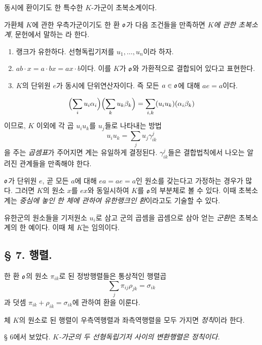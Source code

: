 동시에 환이기도 한 특수한 \(K\)-가군이 \glqq{}초복소계\grqq{}이다.

가환체 \(K\)에 관한 우측가군이기도 한 환 \(\mathfrak o\)가 다음 조건들을 만족하면 \emph{\(K\)에 관한 초복소계}, 문헌에서 말하는 라 한다.
\begin{enumerate}
\item 랭크가 유한하다. 선형독립기저를 \(u_1,\ldots,u_n\)이라 하자.
\item \(ab\cdot x=a\cdot bx=ax\cdot b\)이다. 이를 \(K\)가 \(\mathfrak o\)와 가환적으로 결합되어 있다고 표현한다.
\item \(K\)의 단위원 \(e\)가 동시에 단위연산자이다. 즉 모든 \(a\in\mathfrak o\)에 대해 \(ae=a\)이다.\footnotemark
\end{enumerate}

\[
        \Bigl(\sum_i u_i\alpha_i\Bigr)
        \Bigl(\sum_k u_k\beta_k\Bigr)
        =\sum_{i,k}(u_i u_k)(\alpha_i\beta_k)
\]
이므로, \(K\) 이외에 각 곱 \(u_i u_k\)를 \(u_j\)들로 나타내는 방법
\[
        u_i u_k=\sum_j u_j\gamma^j_{ik}
\]
을 주는 \emph{곱셈표}가 주어지면 계는 유일하게 결정된다. \(\gamma^j_{ik}\)들은 결합법칙에서 나오는 알려진 관계들을 만족해야 한다.

\(\mathfrak o\)가 단위원 \(e\), 곧 모든 \(a\)에 대해 \(ea=ae=a\)인 원소를 갖는다고 가정하는 경우가 많다. 그러면 \(K\)의 원소 \(x\)를 \(ex\)와 동일시하여 \(K\)를 \(\mathfrak o\)의 부분체로 볼 수 있다. 이때 초복소계는 \emph{중심에 놓인 한 체에 관하여 유한랭크인 환}이라고도 기술할 수 있다.

유한군의 원소들을 기저원소 \(u_i\)로 삼고 군의 곱셈을 곱셈으로 삼아 얻는 \emph{군환}은 초복소계의 한 예이다. 이때 체 \(K\)는 임의이다.

\subsection*{§ 7. 행렬.}

한 환 \(\mathfrak o\)의 원소 \(\pi_{ik}\)로 된 정방행렬들은 통상적인 행렬곱
\[
        \sum_j\pi_{ij}\rho_{jk}=\sigma_{ik}
\]
과 덧셈 \(\pi_{ik}+\rho_{ik}=\sigma_{ik}\)에 관하여 환을 이룬다.

체 \(K\)의 원소로 된 행렬이 우측역행렬과 좌측역행렬을 모두 가지면 \emph{정칙}이라 한다.

§ 6에서 보았다. \emph{\(K\)-가군의 두 선형독립기저 사이의 변환행렬은 정칙이다.}

